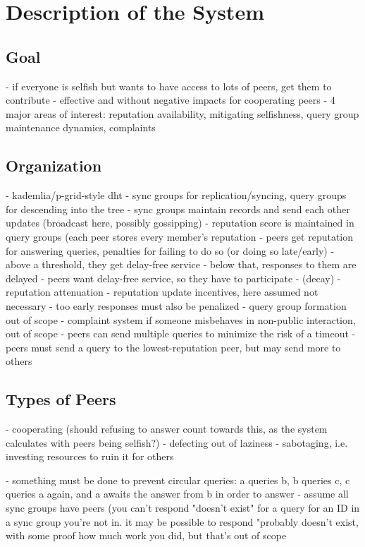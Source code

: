 \chapter{Description of the System}
\section{Goal}
- if everyone is selfish but wants to have access to lots of peers, get them to
  contribute
- effective and without negative impacts for cooperating peers
- 4 major areas of interest: reputation availability, mitigating selfishness,
  query group maintenance dynamics, complaints

\section{Organization}
- kademlia/p-grid-style dht
- sync groups for replication/syncing, query groups for descending into the tree
- sync groups maintain records and send each other updates (broadcast here,
  possibly gossipping)
- reputation score is maintained in query groups (each peer stores every
  member's reputation
- peers get reputation for answering queries, penalties for failing to do so (or
  doing so late/early)
- above a threshold, they get delay-free service
- below that, responses to them are delayed
- peers want delay-free service, so they have to participate
- (decay)
- reputation attenuation
- reputation update incentives, here assumed not necessary
- too early responses must also be penalized
- query group formation out of scope
- complaint system if someone misbehaves in non-public interaction, out of scope
- peers can send multiple queries to minimize the risk of a timeout
- peers must send a query to the lowest-reputation peer, but may send more to
  others

\section{Types of Peers}
- cooperating (should refusing to answer count towards this, as the system
  calculates with peers being selfish?)
- defecting out of laziness
- sabotaging, i.e. investing resources to ruin it for others


- something must be done to prevent circular queries: a queries b, b queries c,
  c queries a again, and a awaits the answer from b in order to answer
- assume all sync groups have peers (you can't respond "doesn't exist" for a
  query for an ID in a sync group you're not in. it may be possible to respond
  "probably doesn't exist, with some proof how much work you did, but that's out
  of scope

